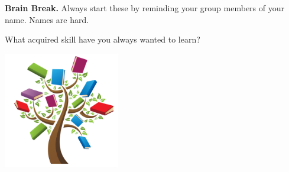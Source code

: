 \documentclass[handout]{beamer}
\newcommand{\fn}{\insertframenumber}
\theoremstyle{definition}
\begin{document}
\begin{frame}{\fn}
	\begin{block}{\textbf{Brain Break.}}
		Always start these by reminding your group members of your name.  Names are hard.
		
		What acquired skill have you always wanted to learn?
		\begin{center}
			\includegraphics[width=2in]{images/skill_tree}
		\end{center}
	\end{block}
\end{frame}
\end{document}
